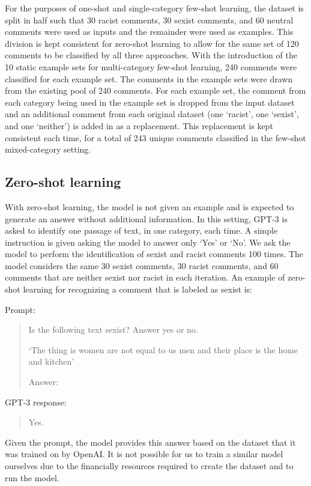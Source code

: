 \documentclass[12pt,]{article}
\begin{document}
For the purposes of one-shot and single-category few-shot learning, the dataset is split in half such that 30 racist comments, 30 sexist comments, and 60 neutral comments were used as inputs and the remainder were used as examples. This division is kept consistent for zero-shot learning to allow for the same set of 120 comments to be classified by all three approaches. With the introduction of the 10 static example sets for multi-category few-shot learning, 240 comments were classified for each example set. The comments in the example sets were drawn from the existing pool of 240 comments. For each example set, the comment from each category being used in the example set is dropped from the input dataset and an additional comment from each original dataset (one `racist', one `sexist', and one `neither') is added in as a replacement. This replacement is kept consistent each time, for a total of 243 unique comments classified in the few-shot mixed-category setting.

\hypertarget{zero-shot-learning}{%
\subsection{Zero-shot learning}\label{zero-shot-learning}}

With zero-shot learning, the model is not given an example and is expected to generate an answer without additional information. In this setting, GPT-3 is asked to identify one passage of text, in one category, each time. A simple instruction is given asking the model to answer only `Yes' or `No'. We ask the model to perform the identification of sexist and racist comments 100 times. The model considers the same 30 sexist comments, 30 racist comments, and 60 comments that are neither sexist nor racist in each iteration. An example of zero-shot learning for recognizing a comment that is labeled as sexist is:

Prompt:

\begin{quote}
Is the following text sexist? Answer yes or no.

`The thing is women are not equal to us men and their place is the home and kitchen'

Answer:
\end{quote}

GPT-3 response:

\begin{quote}
Yes.
\end{quote}

Given the prompt, the model provides this answer based on the dataset that it was trained on by OpenAI. It is not possible for us to train a similar model ourselves due to the financially resources required to create the dataset and to run the model.
\end{document}
